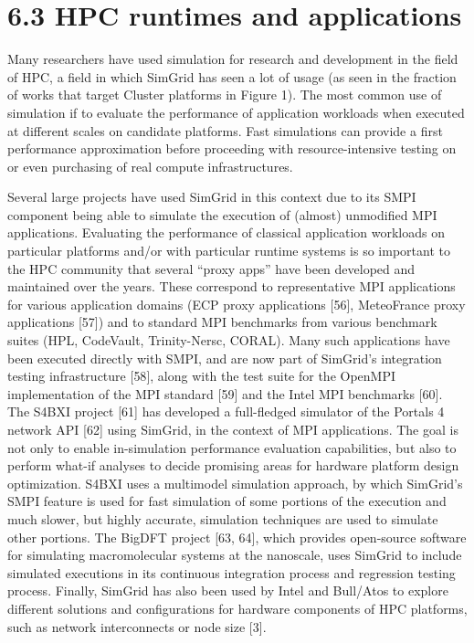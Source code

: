 \documentclass[
]{article}
\begin{document}
\section{6.3 HPC runtimes and
applications}\label{hpc-runtimes-and-applications}

Many researchers have used simulation for research and development in
the field of HPC, a field in which SimGrid has seen a lot of usage (as
seen in the fraction of works that target Cluster platforms in Figure
1). The most common use of simulation if to evaluate the performance of
application workloads when executed at different scales on candidate
platforms. Fast simulations can provide a first performance
approximation before proceeding with resource-intensive testing on or
even purchasing of real compute infrastructures.

Several large projects have used SimGrid in this context due to its SMPI
component being able to simulate the execution of (almost) unmodified
MPI applications. Evaluating the performance of classical application
workloads on particular platforms and/or with particular runtime systems
is so important to the HPC community that several ``proxy apps'' have
been developed and maintained over the years. These correspond to
representative MPI applications for various application domains (ECP
proxy applications {[}56{]}, MeteoFrance proxy applications {[}57{]})
and to standard MPI benchmarks from various benchmark suites (HPL,
CodeVault, Trinity-Nersc, CORAL). Many such applications have been
executed directly with SMPI, and are now part of SimGrid's integration
testing infrastructure {[}58{]}, along with the test suite for the
OpenMPI implementation of the MPI standard {[}59{]} and the Intel MPI
benchmarks {[}60{]}. The S4BXI project {[}61{]} has developed a
full-fledged simulator of the Portals 4 network API {[}62{]} using
SimGrid, in the context of MPI applications. The goal is not only to
enable in-simulation performance evaluation capabilities, but also to
perform what-if analyses to decide promising areas for hardware platform
design optimization. S4BXI uses a multimodel simulation approach, by
which SimGrid's SMPI feature is used for fast simulation of some
portions of the execution and much slower, but highly accurate,
simulation techniques are used to simulate other portions. The BigDFT
project {[}63, 64{]}, which provides open-source software for simulating
macromolecular systems at the nanoscale, uses SimGrid to include
simulated executions in its continuous integration process and
regression testing process. Finally, SimGrid has also been used by Intel
and Bull/Atos to explore different solutions and configurations for
hardware components of HPC platforms, such as network interconnects or
node size {[}3{]}.
\end{document}
